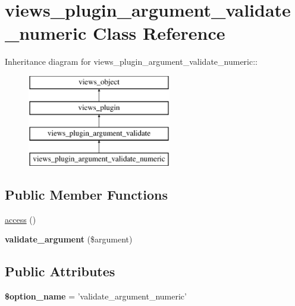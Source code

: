 \hypertarget{classviews__plugin__argument__validate__numeric}{
\section{views\_\-plugin\_\-argument\_\-validate\_\-numeric Class Reference}
\label{classviews__plugin__argument__validate__numeric}
}
Inheritance diagram for views\_\-plugin\_\-argument\_\-validate\_\-numeric::\begin{figure}[H]
\begin{center}
\leavevmode
\includegraphics[height=4cm]{classviews__plugin__argument__validate__numeric}
\end{center}
\end{figure}
\subsection*{Public Member Functions}
\begin{CompactItemize}
\item 
\hyperlink{classviews__plugin__argument__validate__numeric_fa33dbc88c165f2505c5fdf1c9263b8f}{access} ()
\item 
\hypertarget{classviews__plugin__argument__validate__numeric_da84b4fc79f444e178c02b8d505b2d86}{
\textbf{validate\_\-argument} (\$argument)}
\label{classviews__plugin__argument__validate__numeric_da84b4fc79f444e178c02b8d505b2d86}

\end{CompactItemize}
\subsection*{Public Attributes}
\begin{CompactItemize}
\item 
\hypertarget{classviews__plugin__argument__validate__numeric_2da23b08c469d71a2f896f84a7f239a3}{
\textbf{\$option\_\-name} = 'validate\_\-argument\_\-numeric'}
\label{classviews__plugin__argument__validate__numeric_2da23b08c469d71a2f896f84a7f239a3}

\end{CompactItemize}


